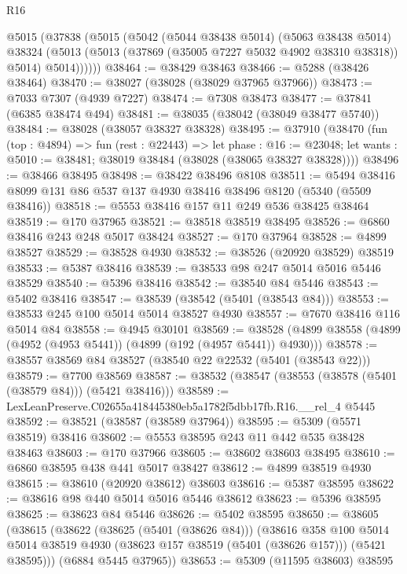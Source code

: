 \begin{lexlean}{R16}
\begin{coremodule}
      @5015
        (@37838
          (@5015
            (@5042
              (@5044 @38438 @5014)
              (@5063 @38438 @5014)
              @38324
              (@5013 (@5013 (@37869 (@35005 @7227 @5032 @4902 @38310 @38318)) @5014) @5014))))))
@38464 := @38429 @38463
@38466 := @5288 (@38426 @38464)
@38470 := @38027 (@38028 (@38029 @37965 @37966))
@38473 := @7033 @7307 (@4939 @7227)
@38474 := @7308 @38473
@38477 := @37841 (@6385 @38474 @494)
@38481 := @38035 (@38042 (@38049 @38477 @5740))
@38484 := @38028 (@38057 @38327 @38328)
@38495 := @37910
    (@38470
      (fun (top : @4894) =>
      fun (rest : @22443) =>
      let phase : @16 := @23048;
      let wants : @5010 := @38481; @38019 @38484 (@38028 (@38065 @38327 @38328))))
@38496 := @38466 @38495
@38498 := @38422 @38496 @8108
@38511 := @5494 @38416 @8099 @131 @86 @537 @137 @4930 @38416 @38496 @8120 (@5340 (@5509 @38416))
@38518 := @5553 @38416 @157 @11 @249 @536 @38425 @38464
@38519 := @170 @37965
@38521 := @38518 @38519 @38495
@38526 := @6860 @38416 @243 @248 @5017 @38424
@38527 := @170 @37964
@38528 := @4899 @38527
@38529 := @38528 @4930
@38532 := @38526 (@20920 @38529) @38519
@38533 := @5387 @38416
@38539 := @38533 @98 @247 @5014 @5016 @5446 @38529
@38540 := @5396 @38416
@38542 := @38540 @84 @5446
@38543 := @5402 @38416
@38547 := @38539 (@38542 (@5401 (@38543 @84)))
@38553 := @38533 @245 @100 @5014 @5014 @38527 @4930
@38557 := @7670 @38416 @116 @5014 @84
@38558 := @4945 @30101
@38569 := @38528 (@4899 @38558 (@4899 (@4952 (@4953 @5441)) (@4899 (@192 (@4957 @5441)) @4930)))
@38578 := @38557 @38569 @84 @38527 (@38540 @22 @22532 (@5401 (@38543 @22)))
@38579 := @7700 @38569
@38587 := @38532 (@38547 (@38553 (@38578 (@5401 (@38579 @84))) (@5421 @38416)))
@38589 := LexLeanPreserve.C02655a418445380eb5a1782f5dbb17fb.R16.__rel_4 @5445
@38592 := @38521 (@38587 (@38589 @37964))
@38595 := @5309 (@5571 @38519) @38416
@38602 := @5553 @38595 @243 @11 @442 @535 @38428 @38463
@38603 := @170 @37966
@38605 := @38602 @38603 @38495
@38610 := @6860 @38595 @438 @441 @5017 @38427
@38612 := @4899 @38519 @4930
@38615 := @38610 (@20920 @38612) @38603
@38616 := @5387 @38595
@38622 := @38616 @98 @440 @5014 @5016 @5446 @38612
@38623 := @5396 @38595
@38625 := @38623 @84 @5446
@38626 := @5402 @38595
@38650 := @38605
    (@38615
      (@38622
        (@38625 (@5401 (@38626 @84)))
        (@38616
          @358
          @100
          @5014
          @5014
          @38519
          @4930
          (@38623 @157 @38519 (@5401 (@38626 @157)))
          (@5421 @38595)))
      (@6884 @5445 @37965))
@38653 := @5309 (@11595 @38603) @38595

\end{coremodule}
\end{lexlean}
